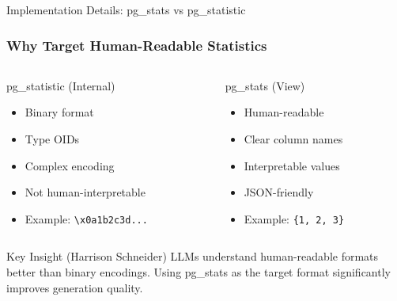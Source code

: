 \documentclass{beamer}
\begin{document}
\begin{frame}{Implementation Details: pg\_stats vs pg\_statistic}
\frametitle{Why Target Human-Readable Statistics}

\begin{columns}[T]
\begin{column}{0.5\textwidth}
\begin{block}{pg\_statistic (Internal)}
\begin{itemize}
    \item Binary format
    \item Type OIDs
    \item Complex encoding
    \item Not human-interpretable
    \item Example: \texttt{\textbackslash x0a1b2c3d...}
\end{itemize}
\end{block}
\end{column}

\begin{column}{0.5\textwidth}
\begin{block}{pg\_stats (View)}
\begin{itemize}
    \item Human-readable
    \item Clear column names
    \item Interpretable values
    \item JSON-friendly
    \item Example: \texttt{\{1, 2, 3\}}
\end{itemize}
\end{block}
\end{column}
\end{columns}

\vspace{0.5cm}

\begin{alertblock}{Key Insight (Harrison Schneider)}
LLMs understand human-readable formats better than binary encodings. Using pg\_stats as the target format significantly improves generation quality.
\end{alertblock}

\end{frame}
\end{document}
